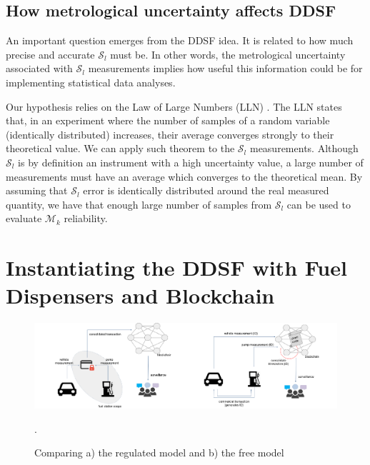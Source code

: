 \documentclass[sigplan]{acmart}
\begin{document}
\subsection{How metrological uncertainty affects DDSF}
\label{s:uncertainty}
An important question emerges from the DDSF idea.
It is related to how much precise and accurate $\mathcal{S}_l$ must be.
In other words, the metrological uncertainty associated with $\mathcal{S}_l$ measurements implies how useful this information could be for implementing statistical data analyses.

Our hypothesis relies on the Law of Large Numbers (LLN) \cite{Evans2004}.
The LLN states that, in an experiment where the number of samples of a random variable (identically distributed) increases, their average converges strongly to their theoretical value.
We can apply such theorem to the $\mathcal{S}_l$ measurements.
Although $\mathcal{S}_l$ is by definition an instrument with a high uncertainty value, a large number of measurements must have an average which converges to the theoretical mean.
By assuming that $\mathcal{S}_l$ error is identically distributed around the real measured quantity, we have that enough large number of samples from $\mathcal{S}_l$ can be used to evaluate $\mathcal{M}_k$ reliability.

\section{Instantiating the DDSF with Fuel Dispensers and Blockchain}

\begin{figure}[!t]
\centering
\includegraphics[width=.95\textwidth]{reg-free}
\caption{Comparing a) the regulated model and b) the free model}.
\label{f:reg-free}
\end{figure}
\end{document}
